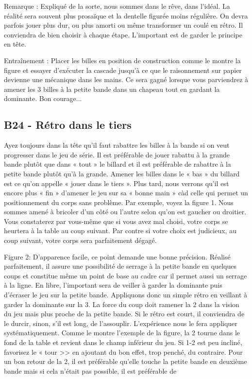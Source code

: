 Remarque : Expliqué de la sorte, nous sommes dans le rêve, dans l'idéal.
La réalité sera souvent plus prosaïque et la dentelle figurée moins
régulière. On devra parfois jouer plus dur, ou plus amorti ou même
transformer un coulé en rétro. Il conviendra de bien choisir à chaque
étape. L'important est de garder le principe en tête.

Entraînement : Placer les billes en position de construction comme le
montre la figure et essayer d'exécuter la cascade jusqu'à ce que le
raisonnement sur papier devienne une mécanique dans les mains. Ce sera
gagné lorsque vous parviendrez à amener les 3 billes à la petite bande
dans un chapeau tout en gardant la dominante. Bon courage...

\subsection{B24 - Rétro dans le
tiers}\label{b24---ruxe9tro-dans-le-tiers}

Ayez toujours dans la tête qu'il faut rabattre les billes à la bande si
on veut progresser dans le jeu de série. Il est préférable de jouer
rabattu à la grande bande plutôt que dans « tout » le billard et il est
préférable de rabattre à la petite bande plutôt qu'à la grande. Amener
les billes dans le « bas » du billard est ce qu'on appelle « jouer dans
le tiers ». Plus tard, nous verrons qu'il est encore plus « fin »
d'amener le jeu sur sa « bonne main » càd celle qui permet un
positionnement du corps sans problème. Par exemple, voyez la figure 1.
Nous sommes amené à bricoler d'un côté ou l'autre selon qu'on est
gaucher ou droitier. Vous constaterez par vous-même que si vous avez mal
choisi, votre corps se heurtera à la table au coup suivant. Par contre
si votre choix est judicieux, au coup suivant, votre corps sera
parfaitement dégagé.

Figure 2: D'apparence facile, ce point demande une bonne précision.
Réalisé parfaitement, il assure une possibilité de serrage à la petite
bande en quelques coups et constitue même un point de base au cadre car
il permet aussi un serrage à la ligne. En libre, l'important sera de
veiller à garder la dominante puis d'écraser le jeu sur la petite bande.
Appliquons donc un simple rétro en veillant à garder la dominante sur la
3. La force du coup doit ramener la 2 dans la vision du jeu mais plus
proche de la petite bande. Si le rétro est court, il conviendra de le
durcir, sinon, s'il est long, de l'assouplir. L'expérience nous le fera
appliquer systématiquement. Comme le montre l'exemple de la figure, la 2
tourne dans le fond de la table et revient dans le champ inférieur du
jeu. Si 1-2 est peu incliné, favorisez le « tour
\textgreater{}\textgreater{} en ajoutant du bon effet, trop penché, du
contraire. Pour un bon retour de la 2, il est préférable qu'elle touche
la petite bande en deuxième bande mais si cela n'était pas possible, il
est préférable de

